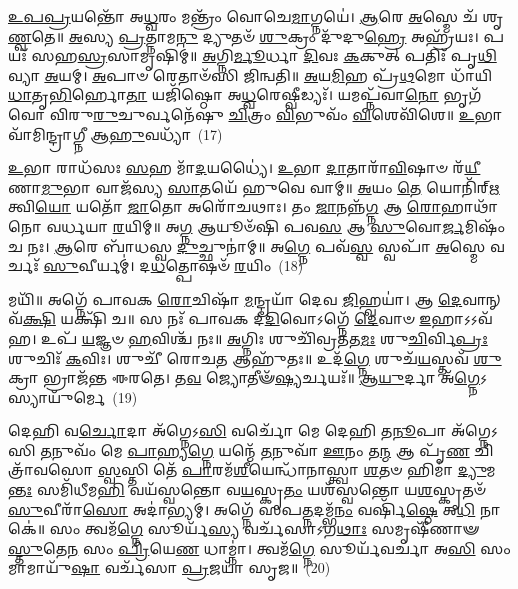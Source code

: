{\anuvakamend[{\-\ul{𑌏}\-𑌤\-\ul{𑌮𑍇}\-𑌵 \ul{𑌜𑌿}\-𑌹𑍍𑌵𑌾 \ul{𑌏}\-𑌤𑌾𑌨𑍍 𑌪𑌞𑍍𑌚᳴𑌵𑌿𑍞𑌶𑌤𑌿𑌶𑍍𑌚}]}%

\-\ul{𑌉}\-\-\ul{𑌪}\-\-\ul{𑌪𑍍𑌰}\-𑌯𑌨𑍍𑌤𑍋᳴ 𑌅\-\ul{𑌧𑍍𑌵}\-𑌰𑌂 𑌮𑌨𑍍𑌤𑍍𑌰𑌂᳴ 𑌵𑍋𑌚𑍇\-\ul{𑌮𑌾}\-𑌗𑍍𑌨𑌯𑍇॑। \ul{𑌆}\-𑌰𑍇 \ul{𑌅}\-𑌸𑍍𑌮𑍇 𑌚᳴ 𑌶𑍃\-\ul{𑌣𑍍𑌵}\-𑌤𑍇॥ \ul{𑌅}\-𑌸𑍍𑌯 \ul{𑌪𑍍𑌰}\-𑌤𑍍𑌨𑌾𑌮\-\ul{𑌨𑍁} 𑌦𑍍𑌯𑍁𑌤𑍞᳴ \ul{𑌶𑍁}\-𑌕𑍍𑌰𑌂 𑌦𑍁᳴𑌦𑍁\-\ul{𑌹𑍍𑌰𑍇} 𑌅𑌹𑍍𑌰᳴𑌯𑌃। 𑌪𑌯𑌃᳴ 𑌸𑌹\-\ul{𑌸𑍍𑌰}\-𑌸𑌾𑌮𑍃𑌷𑌿𑌮𑍍॑॥ \ul{𑌅}\-𑌗𑍍𑌨𑌿\-\ul{𑌰𑍍𑌮𑍂}\-𑌰𑍍𑌧𑌾 \ul{𑌦𑌿}\-𑌵𑌃 \ul{𑌕}\-𑌕𑍁𑌤𑍍 𑌪𑌤𑌿𑌃᳴ 𑌪𑍃\-\ul{𑌥𑌿}\-𑌵𑍍𑌯𑌾 \ul{𑌅}\-𑌯𑌮𑍍। \ul{𑌅}\-𑌪𑌾𑍞 𑌰𑍇𑌤𑌾𑍞᳴𑌸𑌿 𑌜𑌿𑌨𑍍𑌵𑌤𑌿॥ \ul{𑌅}\-𑌯\-\ul{𑌮𑌿}\-𑌹 𑌪𑍍𑌰᳴\-\ul{𑌥}\-𑌮𑍋 𑌧𑌾᳴𑌯𑌿 \ul{𑌧𑌾}\-𑌤𑍃\-\ul{𑌭𑌿}\-𑌰𑍍\mbox{}𑌹𑍋\-\ul{𑌤𑌾} 𑌯𑌜𑌿᳴𑌷𑍍𑌠𑍋 𑌅\-\ul{𑌧𑍍𑌵}\-𑌰𑍇𑌷𑍍𑌵𑍀𑌡𑍍𑌯𑌃᳴। 𑌯𑌮𑌪𑍍𑌨᳴𑌵𑌾\-\ul{𑌨𑍋} 𑌭𑍃𑌗᳴𑌵𑍋 𑌵𑌿𑌰𑍁\-\ul{𑌰𑍁}\-𑌚𑍁𑌰𑍍𑌵𑌨𑍇᳴𑌷𑍁 \ul{𑌚𑌿}\-𑌤𑍍𑌰𑌂 \ul{𑌵𑌿}\-𑌭𑍁𑌵𑌂᳴ \ul{𑌵𑌿}\-𑌶𑍇𑌵𑌿᳴𑌶𑍇॥ \ul{𑌉}\-𑌭𑌾 𑌵𑌾᳴𑌮𑌿𑌨𑍍𑌦𑍍𑌰𑌾𑌗𑍍𑌨𑍀 𑌆\-\ul{𑌹𑍁}\-𑌵𑌧𑍍𑌯𑌾᳴~(17)

\-\ul{𑌉}\-𑌭𑌾 𑌰𑌾𑌧᳴𑌸𑌃 \ul{𑌸}\-𑌹 𑌮𑌾᳴\-\ul{𑌦}\-𑌯𑌧𑍍𑌯𑍈॑। \ul{𑌉}\-𑌭𑌾 \ul{𑌦𑌾}\-𑌤𑌾𑌰𑌾᳴\-\ul{𑌵𑌿}\-𑌷𑌾𑍞 𑌰᳴\-\ul{𑌯𑍀}\-𑌣𑌾\-\ul{𑌮𑍁}\-𑌭𑌾 𑌵𑌾𑌜᳴𑌸𑍍𑌯 \ul{𑌸𑌾}\-𑌤𑌯𑍇᳴ 𑌹𑍁𑌵𑍇 𑌵𑌾𑌮𑍍॥ \ul{𑌅}\-𑌯𑌂 \ul{𑌤𑍇} 𑌯𑍋𑌨𑌿᳴𑌰𑍍\mbox{}\-\ul{𑌋}\-𑌤𑍍𑌵𑌿\-\ul{𑌯𑍋} 𑌯𑌤𑍋᳴ \ul{𑌜𑌾}\-𑌤𑍋 𑌅𑌰𑍋᳴𑌚𑌥𑌾𑌃। 𑌤𑌂 \ul{𑌜𑌾}\-𑌨𑌨𑍍𑌨᳴\-\ul{𑌗𑍍𑌨} 𑌆 \ul{𑌰𑍋}\-𑌹𑌾𑌥𑌾᳴ 𑌨𑍋 𑌵𑌰𑍍𑌧𑌯𑌾 \ul{𑌰}\-𑌯𑌿𑌮𑍍॥ 𑌅\-\ul{𑌗𑍍𑌨} 𑌆𑌯𑍂𑍞᳴𑌷𑌿 𑌪𑌵\-\ul{𑌸} 𑌆 \ul{𑌸𑍁}\-𑌵𑍋\-\ul{𑌰𑍍𑌜}\-𑌮𑌿𑌷𑌂᳴ 𑌚 𑌨𑌃। \ul{𑌆}\-𑌰𑍇 𑌬𑌾᳴𑌧𑌸𑍍𑌵 \ul{𑌦𑍁}\-𑌚𑍍𑌛𑍁𑌨𑌾॑𑌮𑍍॥ 𑌅\-\ul{𑌗𑍍𑌨𑍇} 𑌪𑌵᳴\-\ul{𑌸𑍍𑌵} 𑌸𑍍𑌵𑌪𑌾᳴ \ul{𑌅}\-𑌸𑍍𑌮𑍇 𑌵𑌰𑍍𑌚𑌃᳴ \ul{𑌸𑍁}\-𑌵𑍀𑌰𑍍𑌯𑌮𑍍॑। 𑌦\-\ul{𑌧}\-𑌤𑍍𑌪𑍋𑌷𑍞᳴ \ul{𑌰}\-𑌯𑌿𑌂~(18)

𑌮𑌯𑌿᳴॥ 𑌅𑌗𑍍𑌨𑍇᳴ 𑌪𑌾𑌵𑌕 \ul{𑌰𑍋}\-𑌚𑌿𑌷𑌾᳴ \ul{𑌮}\-𑌨𑍍𑌦𑍍𑌰𑌯𑌾᳴ 𑌦𑍇𑌵 \ul{𑌜𑌿}\-𑌹𑍍𑌵𑌯𑌾॑। 𑌆 \ul{𑌦𑍇}\-𑌵𑌾𑌨𑍍 𑌵᳴\-\ul{𑌕𑍍𑌷𑌿} 𑌯𑌕𑍍𑌷𑌿᳴ 𑌚॥ 𑌸 𑌨𑌃᳴ 𑌪𑌾𑌵𑌕 𑌦𑍀\-\ul{𑌦𑌿}\-𑌵𑍋\-𑌽𑌗𑍍𑌨𑍇᳴ \ul{𑌦𑍇}\-𑌵𑌾𑍞 \ul{𑌇}\-𑌹𑌾\-𑌽\-𑌽𑌵᳴𑌹। 𑌉𑌪᳴ \ul{𑌯}\-𑌜𑍍𑌞𑍞 \ul{𑌹}\-𑌵𑌿𑌶𑍍𑌚᳴ 𑌨𑌃॥ \ul{𑌅}\-𑌗𑍍𑌨𑌿𑌃 𑌶𑍁𑌚𑌿᳴𑌵𑍍𑌰𑌤𑌤\-\ul{𑌮𑌃} 𑌶𑍁\-\ul{𑌚𑌿}\-𑌰𑍍𑌵𑌿\-\ul{𑌪𑍍𑌰𑌃} 𑌶𑍁𑌚𑌿𑌃᳴ \ul{𑌕}\-𑌵𑌿𑌃। 𑌶𑍁𑌚𑍀᳴ 𑌰𑍋𑌚\-\ul{𑌤} 𑌆𑌹𑍁᳴𑌤𑌃॥ 𑌉𑌦᳴\-\ul{𑌗𑍍𑌨𑍇} 𑌶𑍁𑌚᳴\-\ul{𑌯}\-𑌸𑍍𑌤𑌵᳴ \ul{𑌶𑍁}\-𑌕𑍍𑌰𑌾 𑌭𑍍𑌰𑌾𑌜᳴𑌨𑍍𑌤 𑌈𑌰𑌤𑍇। 𑌤\-\ul{𑌵} 𑌜𑍍𑌯𑍋𑌤𑍀𑍟᳴\-\ul{𑌷𑍍𑌯}\-𑌰𑍍𑌚𑌯𑌃᳴॥ \ul{𑌆}\-\-\ul{𑌯𑍁}\-𑌰𑍍𑌦𑌾 𑌅᳴\-\ul{𑌗𑍍𑌨𑍇}\-\-𑌽𑌸𑍍𑌯𑌾𑌯𑍁᳴𑌰𑍍𑌮𑍇~(19)

𑌦𑍇𑌹𑌿 𑌵\-\ul{𑌰𑍍𑌚𑍋}\-𑌦𑌾 𑌅᳴𑌗𑍍𑌨𑍇\-𑌽\-\ul{𑌸𑌿} 𑌵𑌰𑍍𑌚𑍋᳴ 𑌮𑍇 𑌦𑍇𑌹𑌿 𑌤\-\ul{𑌨𑍂}\-𑌪𑌾 𑌅᳴𑌗𑍍𑌨𑍇\-𑌽𑌸𑌿 \ul{𑌤}\-𑌨𑍁𑌵𑌂᳴ 𑌮𑍇 \ul{𑌪𑌾}\-𑌹𑍍𑌯\-\ul{𑌗𑍍𑌨𑍇} 𑌯𑌨𑍍𑌮𑍇᳴ \ul{𑌤}\-𑌨𑍁𑌵𑌾᳴ \ul{𑌊}\-𑌨𑌂 𑌤\-\ul{𑌨𑍍𑌮} 𑌆 𑌪𑍃᳴\-\ul{𑌣} 𑌚𑌿𑌤𑍍𑌰𑌾᳴𑌵𑌸𑍋 \ul{𑌸𑍍𑌵}\-𑌸𑍍𑌤𑌿 𑌤𑍇᳴ \ul{𑌪𑌾}\-𑌰𑌮᳴\-\ul{𑌶𑍀}\-𑌯𑍇𑌨𑍍𑌧𑌾᳴𑌨𑌾𑌸𑍍𑌤𑍍𑌵𑌾 \ul{𑌶}\-𑌤𑍞 𑌹𑌿𑌮𑌾॑ \ul{𑌦𑍍𑌯𑍁}\-𑌮\-\ul{𑌨𑍍𑌤𑌃} 𑌸𑌮𑌿᳴𑌧𑍀𑌮\-\ul{𑌹𑌿} 𑌵𑌯᳴𑌸𑍍𑌵𑌨𑍍𑌤𑍋 𑌵\-\ul{𑌯}\-𑌸𑍍𑌕𑍃\-\ul{𑌤𑌂} 𑌯𑌶᳴𑌸𑍍𑌵𑌨𑍍𑌤𑍋 𑌯\-\ul{𑌶}\-𑌸𑍍𑌕𑍃𑌤𑍞᳴ \ul{𑌸𑍁}\-𑌵𑍀𑌰𑌾᳴\-\ul{𑌸𑍋} 𑌅𑌦𑌾॑𑌭𑍍𑌯𑌮𑍍। 𑌅𑌗𑍍𑌨𑍇᳴ 𑌸𑌪\-\ul{𑌤𑍍𑌨}\-𑌦𑌮𑍍𑌭᳴\-\ul{𑌨𑌂} 𑌵𑌰𑍍\mbox{}𑌷𑌿᳴\-\ul{𑌷𑍍𑌠𑍇} 𑌅\-\ul{𑌧𑌿} 𑌨𑌾𑌕𑍇॑॥ 𑌸𑌂 𑌤𑍍𑌵𑌮᳴\-\ul{𑌗𑍍𑌨𑍇} 𑌸𑍂𑌰𑍍𑌯᳴\-\ul{𑌸𑍍𑌯} 𑌵𑌰𑍍𑌚᳴𑌸𑌾\-𑌽𑌗\-\ul{𑌥𑌾𑌃} 𑌸𑌮𑍃𑌷𑍀᳴𑌣𑌾𑍟 \ul{𑌸𑍍𑌤𑍁}\-𑌤𑍇\-\ul{𑌨} 𑌸𑌂 \ul{𑌪𑍍𑌰𑌿}\-𑌯𑍇\-\ul{𑌣} 𑌧𑌾𑌮𑍍𑌨𑌾॑। 𑌤𑍍𑌵𑌮᳴\-\ul{𑌗𑍍𑌨𑍇} 𑌸𑍂𑌰𑍍𑌯᳴𑌵𑌰𑍍𑌚𑌾 𑌅\-\ul{𑌸𑌿} 𑌸𑌂 𑌮𑌾𑌮𑌾𑌯𑍁᳴\-\ul{𑌷𑌾} 𑌵𑌰𑍍𑌚᳴𑌸𑌾 \ul{𑌪𑍍𑌰}\-𑌜𑌯𑌾᳴ 𑌸𑍃𑌜॥~(20)

